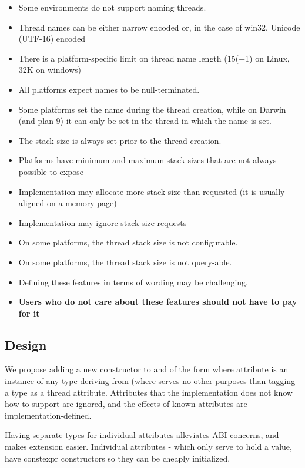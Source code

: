 \documentclass{wg21}
\begin{document}
\begin{itemize}
\item Some environments do not support naming threads.
\item Thread names can be either narrow encoded or, in the case of win32, Unicode (UTF-16) encoded
\item There is a platform-specific limit on thread name length (15(+1) on Linux, 32K on windows)
\item All platforms expect names to be null-terminated.
\item Some platforms set the name during the thread creation, while on Darwin (and plan 9) it can only be set in the thread in which the name is set.
\item The stack size is always set prior to the thread creation.
\item Platforms have minimum and maximum stack sizes that are not always possible to expose
\item Implementation may allocate more stack size than requested (it is usually aligned on a memory page)
\item Implementation may ignore stack size requests
\item On some platforms, the thread stack size is not configurable.
\item On some platforms, the thread stack size is not query-able.
\item Defining these features in terms of wording may be challenging.
\item \textbf{Users who do not care about these features should not have to pay for it}
\end{itemize}

\subsection{Design}

We propose adding a new constructor to  and 
of the form  where attribute is
an instance of any type deriving from  (where   serves no
other purposes than tagging a type as a thread attribute. Attributes that the implementation does not know how to support
are ignored, and the effects of known attributes are implementation-defined.

Having separate types for individual attributes alleviates ABI concerns, and makes extension easier.
Individual attributes - which only serve to hold a value, have constexpr constructors so they can be cheaply initialized.
\end{document}

